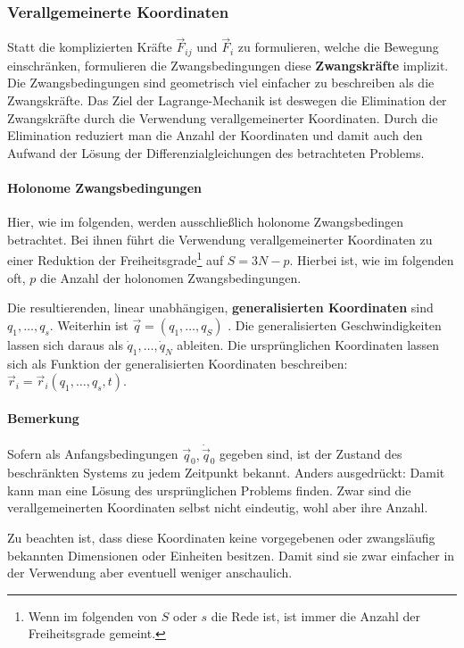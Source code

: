 \documentclass[oneside]{book}
\theoremstyle{definition}
\newcommand{\dotvec}[1]{\dot{\vec{#1}}}
\begin{document}
\subsubsection{Verallgemeinerte Koordinaten}
Statt die komplizierten Kräfte $\vec{F}_{ij}$ und $\vec{F}_i$ zu formulieren, welche die Bewegung einschränken, formulieren die Zwangsbedingungen diese \textbf{Zwangskräfte} implizit.
Die Zwangsbedingungen sind geometrisch viel einfacher zu beschreiben als die Zwangskräfte. Das Ziel der Lagrange-Mechanik ist deswegen die Elimination der Zwangskräfte durch die Verwendung verallgemeinerter Koordinaten. Durch die Elimination reduziert man die Anzahl der Koordinaten und damit auch den Aufwand der Lösung der Differenzialgleichungen des betrachteten Problems.

\paragraph{Holonome Zwangsbedingungen}
Hier, wie im folgenden, werden ausschließlich holonome Zwangsbedingen betrachtet. Bei ihnen führt die Verwendung verallgemeinerter Koordinaten zu einer Reduktion der Freiheitsgrade\footnote{Wenn im folgenden von $S$ oder $s$ die Rede ist, ist immer die Anzahl der Freiheitsgrade gemeint.} auf $S = 3N - p$. Hierbei ist, wie im folgenden oft, $p$ die Anzahl der holonomen Zwangsbedingungen. 

Die resultierenden, linear unabhängigen, \textbf{generalisierten Koordinaten} sind $q_1, \dots, q_s$. Weiterhin ist $\vec{q} = (q_1, \dots, q_S)$
. Die generalisierten Geschwindigkeiten lassen sich daraus als $\dot{q}_1, \dots, \dot{q}_N$ ableiten. Die ursprünglichen Koordinaten lassen sich als Funktion der generalisierten Koordinaten beschreiben: $\vec{r}_i = \vec{r}_i(q_1, \dots, q_s, t)$.

\paragraph{Bemerkung}
Sofern als Anfangsbedingungen $\vec{q}_0, \dotvec{q}_0$ gegeben sind, ist der Zustand des beschränkten Systems zu jedem Zeitpunkt bekannt. Anders ausgedrückt: Damit kann man eine Lösung des ursprünglichen Problems finden. Zwar sind die verallgemeinerten Koordinaten selbst nicht eindeutig, wohl aber ihre Anzahl.

Zu beachten ist, dass diese Koordinaten keine vorgegebenen oder zwangsläufig bekannten Dimensionen oder Einheiten besitzen. Damit sind sie zwar einfacher in der Verwendung aber eventuell weniger anschaulich.
\end{document}
